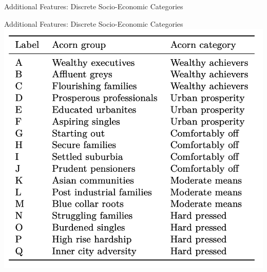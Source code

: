 \documentclass{beamer}
\begin{document}
\begin{frame}{Additional Features: Discrete Socio-Economic Categories}
\end{frame}

\begin{frame}{Additional Features: Discrete Socio-Economic Categories}
  \includegraphics[width=1\textwidth]{images/acorn-groups.png}
\end{frame}
\end{document}
